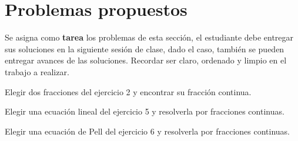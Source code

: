 \section{Problemas propuestos}

Se asigna como \textbf{tarea} los problemas de esta sección, el estudiante debe entregar sus soluciones en la siguiente
sesión de clase, dado el caso, también se pueden entregar avances de las soluciones.
Recordar ser claro, ordenado y limpio en el trabajo a realizar.

\begin{exercise}
    Elegir dos fracciones del ejercicio 2 y encontrar su fracción continua.
\end{exercise}

\begin{exercise}
    Elegir una ecuación lineal del ejercicio 5 y resolverla por fracciones continuas.
\end{exercise}

\begin{exercise}
    Elegir una ecuación de Pell del ejercicio 6 y resolverla por fracciones continuas.
\end{exercise}